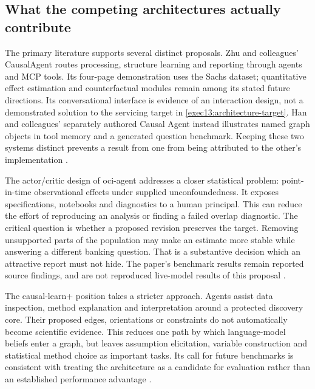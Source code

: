 \subsection{What the competing architectures actually contribute}

The primary literature supports several distinct proposals. Zhu and colleagues'
CausalAgent routes processing, structure learning and reporting through agents
and MCP tools. Its four-page demonstration uses the Sachs dataset; quantitative
effect estimation and counterfactual modules remain among its stated future
directions. Its conversational interface is evidence of an interaction design,
not a demonstrated solution to the servicing target in
\eqref{exec13:architecture-target}. Han and colleagues' separately authored
Causal Agent instead illustrates named graph objects in tool memory and a
generated question benchmark. Keeping these two systems distinct prevents a
result from one from being attributed to the other's implementation
\citep{v12_la_2602_11527,exec13_census_causal_agent}.

The actor/critic design of oci-agent addresses a closer statistical problem:
point-in-time observational effects under supplied unconfoundedness. It exposes
specifications, notebooks and diagnostics to a human principal. This can reduce
the effort of reproducing an analysis or finding a failed overlap diagnostic.
The critical question is whether a proposed revision preserves the target.
Removing unsupported parts of the population may make an estimate more stable
while answering a different banking question. That is a substantive decision
which an attractive report must not hide. The paper's benchmark results remain
reported source findings, and are not reproduced live-model results of this
proposal \citep{v12_la_2607_22443}.

The causal-learn+ position takes a stricter approach. Agents assist data
inspection, method explanation and interpretation around a protected discovery
core. Their proposed edges, orientations or constraints do not automatically
become scientific evidence. This reduces one path by which language-model
beliefs enter a graph, but leaves assumption elicitation, variable construction
and statistical method choice as important tasks. Its call for future
benchmarks is consistent with treating the architecture as a candidate for
evaluation rather than an established performance advantage
\citep{v12_la_2606_23608}.

